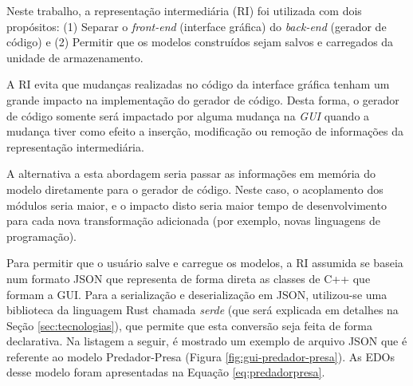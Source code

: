 \documentclass[
	12pt,				%
	openright,			%
	oneside,			%
	a4paper,			%
	main=brazil,
	english,			%
	]{ufsj-abntex2}
\begin{document}
Neste trabalho, a representação intermediária (RI) foi utilizada com dois propósitos: (1) Separar o \textit{front-end} (interface gráfica) do \textit{back-end} (gerador de código) e (2) Permitir que os modelos construídos sejam salvos e carregados da unidade de armazenamento.

A RI evita que mudanças realizadas no código da interface gráfica tenham um grande impacto na implementação do gerador de código. Desta forma, o gerador de código somente será impactado por alguma mudança na \textit{GUI} quando a mudança tiver como efeito a inserção, modificação ou remoção de informações da representação intermediária.

A alternativa a esta abordagem seria passar as informações em memória do modelo diretamente para o gerador de código. Neste caso, o acoplamento dos módulos seria maior, e o impacto disto seria maior tempo de desenvolvimento para cada nova transformação adicionada (por exemplo, novas linguagens de programação).

Para permitir que o usuário salve e carregue os modelos, a RI assumida se baseia num formato JSON que representa de forma direta as classes de C++ que formam a GUI. Para a serialização e deserialização em JSON, utilizou-se uma biblioteca da linguagem Rust chamada \textit{serde} (que será explicada em detalhes na Seção \ref{sec:tecnologias}), que permite que esta conversão seja feita de forma declarativa. Na listagem a seguir, é mostrado um exemplo de arquivo JSON que é referente ao modelo Predador-Presa (Figura \ref{fig:gui-predador-presa}). As EDOs desse modelo foram apresentadas na Equação \ref{eq:predadorpresa}. 



\end{document}

